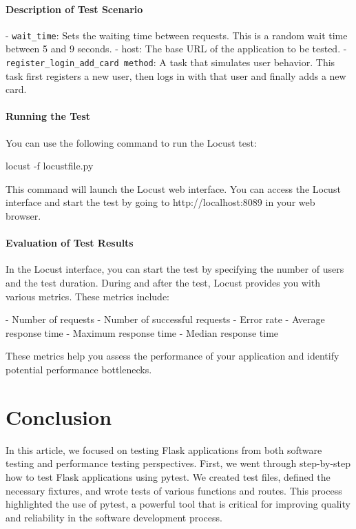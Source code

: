 \paragraph{Description of Test Scenario}
- \texttt{wait\_time}: Sets the waiting time between requests. This is a random wait time between 5 and 9 seconds.
- host: The base URL of the application to be tested.
- \texttt{register\_login\_add\_card method}: A task that simulates user behavior. This task first registers a new user, then logs in with that user and finally adds a new card.

\paragraph{Running the Test}

You can use the following command to run the Locust test:

locust -f locustfile.py

This command will launch the Locust web interface. You can access the Locust interface and start the test by going to http://localhost:8089 in your web browser.

\paragraph{Evaluation of Test Results}

In the Locust interface, you can start the test by specifying the number of users and the test duration. During and after the test, Locust provides you with various metrics. These metrics include:

- Number of requests
- Number of successful requests
- Error rate
- Average response time
- Maximum response time
- Median response time

These metrics help you assess the performance of your application and identify potential performance bottlenecks.


\section{Conclusion}

In this article, we focused on testing Flask applications from both software testing and performance testing perspectives. First, we went through step-by-step how to test Flask applications using pytest. We created test files, defined the necessary fixtures, and wrote tests of various functions and routes. This process highlighted the use of pytest, a powerful tool that is critical for improving quality and reliability in the software development process.

